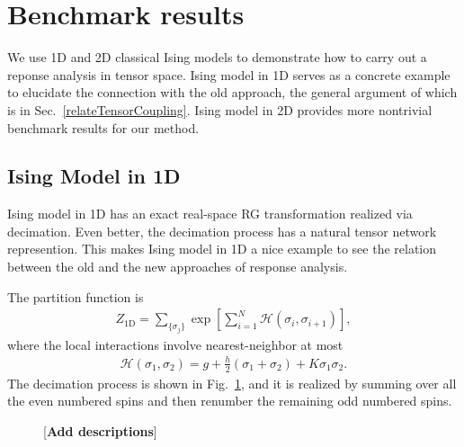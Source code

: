 \documentclass[aps,prb,reprint,superscriptaddress]{revtex4-2}
\begin{document}
\section{Benchmark results\label{benchmark}}
We use 1D and 2D classical Ising models to demonstrate how to carry out
a reponse analysis in tensor space. Ising model in 1D serves as a
concrete example to elucidate the connection with the old approach, the
general argument of which is in Sec.~\ref{relateTensorCoupling}. Ising
model in 2D provides more nontrivial benchmark results for our method.
%

\subsection{Ising Model in 1D\label{benchmark:1DIsing}}
Ising model in 1D has an exact real-space RG transformation realized via
decimation. Even better, the decimation process has a natural tensor
network represention. This makes Ising model in 1D a nice example to see
the relation between the old and the new approaches of response
analysis.
%

The partition function is
%
\begin{align}\label{def:Z4Ising1D}
    Z_{\text{1D}} = \sum_{\{\sigma_j \} } \exp{\left[\sum_{i=1}^N
    \mathscr{H}\left(\sigma_i,\sigma_{i+1}\right)  \right]},
\end{align}
%
where the local interactions involve nearest-neighbor at most
%
\begin{align}\label{def:H4Ising1D}
    \mathscr{H}\left(\sigma_1, \sigma_2\right) = g +
    \frac{h}{2}\left(\sigma_1 + \sigma_2\right) + K\sigma_1 \sigma_2.
\end{align}
%
The decimation process is shown in Fig.~\ref{fig:Ising1D-decimation},
and it is realized by summing over all the even numbered spins and then
renumber the remaining odd numbered spins. 
%
\begin{figure}[h]
    \caption{\label{fig:Ising1D-decimation}[\textbf{Add descriptions}]}
\end{figure}
%
\end{document}
